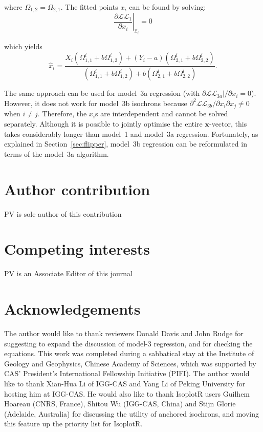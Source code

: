 \documentclass{article}
\begin{document}
\noindent where $\Omega_{1,2}=\Omega_{2,1}$. The fitted points $x_i$
can be found by solving:
\begin{equation}
  \left.\frac{\partial\mathcal{LL}_1}{\partial{x_i}}\right|_{\hat{x}_i} = 0
\end{equation}

\noindent which yields
\begin{equation}
  \hat{x}_i =
  \frac{X_i(\Omega_{1,1}^i + b \Omega_{1,2}^i) + (Y_i-a)(\Omega_{2,1}^i+b\Omega_{2,2}^i)}
       {(\Omega_{1,1}^i + b \Omega_{1,2}^i) + b(\Omega_{2,1}^i+b\Omega_{2,2}^i)}.
       \label{eq:xi}
\end{equation}

The same approach can be used for model~3a regression (with
$\partial{\mathcal{LL}_{3a}|}/\partial{x_i}=0$). However, it does not
work for model~3b isochrons because
$\partial^2{\mathcal{LL}_{3b}}/\partial{x_i}\partial{x_j}\neq{0}$ when
${i}\neq{j}$. Therefore, the $x_i$s are interdependent and cannot be
solved separately. Although it is possible to jointly optimise the
entire $\mathbf{x}$-vector, this takes considerably longer than
model~1 and model~3a regression.  Fortunately, as explained in
Section~\ref{sec:flipper}, model~3b regression can be reformulated in
terms of the model~3a algorithm.




\section*{Author contribution}

PV is sole author of this contribution

\section*{Competing interests}

PV is an Associate Editor of this journal

\section*{Acknowledgements}

The author would like to thank reviewers Donald Davis and John Rudge
for suggesting to expand the discussion of model-3 regression, and for
checking the equations. This work was completed during a sabbatical
stay at the Institute of Geology and Geophysics, Chinese Academy of
Sciences, which was supported by CAS' President's International
Fellowship Initiative (PIFI). The author would like to thank Xian-Hua
Li of IGG-CAS and Yang Li of Peking University for hosting him at
IGG-CAS.  He would also like to thank IsoplotR users Guilhem Hoareau
(CNRS, France), Shitou Wu (IGG-CAS, China) and Stijn Glorie (Adelaide,
Australia) for discussing the utility of anchored isochrons, and
moving this feature up the priority list for IsoplotR.
\end{document}
